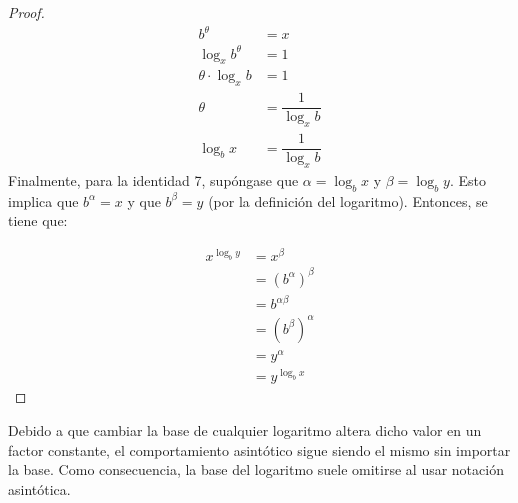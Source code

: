 \begin{proof}
\begin{align*}
b^{\theta} & =x\\
\log_{x}b^{\theta} & =1\\
\theta\cdot\log_{x}b & =1\\
\theta & =\dfrac{1}{\log_{x}b}\\
\log_{b}x & =\dfrac{1}{\log_{x}b}
\end{align*}
Finalmente, para la identidad 7, supóngase que $\alpha=\log_{b}x$
y $\beta=\log_{b}y$. Esto implica que $b^{\alpha}=x$ y que $b^{\beta}=y$
(por la definición del logaritmo). Entonces, se tiene que:

\begin{align*}
x^{\log_{b}y} & =x^{\beta}\\
 & =(b^{\alpha})^{\beta}\\
 & =b^{\alpha\beta}\\
 & =(b^{\beta})^{\alpha}\\
 & =y^{\alpha}\\
 & =y^{\log_{b}x}
\end{align*}
\end{proof}
\begin{rem}
Debido a que cambiar la base de cualquier logaritmo altera dicho valor
en un factor constante, el comportamiento asintótico sigue siendo
el mismo sin importar la base. Como consecuencia, la base del logaritmo
suele omitirse al usar notación asintótica.
\end{rem}


